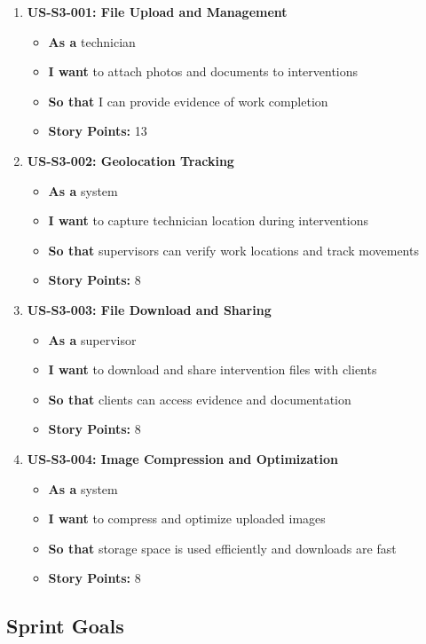 \begin{enumerate}
\item \textbf{US-S3-001: File Upload and Management}
  \begin{itemize}
  \item \textbf{As a} technician
  \item \textbf{I want} to attach photos and documents to interventions
  \item \textbf{So that} I can provide evidence of work completion
  \item \textbf{Story Points:} 13
  \end{itemize}

\item \textbf{US-S3-002: Geolocation Tracking}
  \begin{itemize}
  \item \textbf{As a} system
  \item \textbf{I want} to capture technician location during interventions
  \item \textbf{So that} supervisors can verify work locations and track movements
  \item \textbf{Story Points:} 8
  \end{itemize}

\item \textbf{US-S3-003: File Download and Sharing}
  \begin{itemize}
  \item \textbf{As a} supervisor
  \item \textbf{I want} to download and share intervention files with clients
  \item \textbf{So that} clients can access evidence and documentation
  \item \textbf{Story Points:} 8
  \end{itemize}

\item \textbf{US-S3-004: Image Compression and Optimization}
  \begin{itemize}
  \item \textbf{As a} system
  \item \textbf{I want} to compress and optimize uploaded images
  \item \textbf{So that} storage space is used efficiently and downloads are fast
  \item \textbf{Story Points:} 8
  \end{itemize}
\end{enumerate}
\subsection{Sprint Goals}

